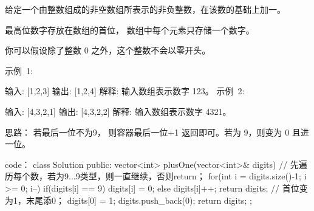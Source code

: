 给定一个由整数组成的非空数组所表示的非负整数，在该数的基础上加一。

最高位数字存放在数组的首位， 数组中每个元素只存储一个数字。

你可以假设除了整数 0 之外，这个整数不会以零开头。

示例 1:

输入: [1,2,3]
输出: [1,2,4]
解释: 输入数组表示数字 123。
示例 2:

输入: [4,3,2,1]
输出: [4,3,2,2]
解释: 输入数组表示数字 4321。































思路：
若最后一位不为9， 则容器最后一位+1 返回即可。若为 9，则变为 0 且进一位。
































code：
class Solution {
public:
    vector<int> plusOne(vector<int>& digits) {
        // 先遍历每个数，若为9...9类型，则一直继续，否则return；
        for(int i = digits.size()-1; i >= 0; i--)
        {
            if(digits[i] == 9) digits[i] = 0;
            else
            {
                digits[i]++;
                return digits;
            }
        }
        // 首位变为1，末尾添0；
        digits[0] = 1;
        digits.push_back(0);
        return digits;
    }
};